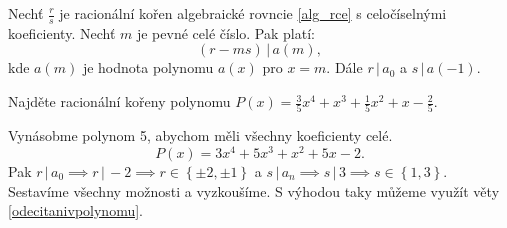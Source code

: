 \begin{veta}\label{odecitanivpolynomu}
    Nechť $\frac{r}{s}$ je racionální kořen algebraické rovncie \ref{alg_rce} s celočíselnými koeficienty.
    Nechť $m$ je pevné celé číslo. Pak platí:
    $$(r-ms) \, |\, a(m),$$
    kde $a(m)$ je hodnota polynomu $a(x)$ pro $x=m.$ Dále $r \, | \, a_0$ a $s\, |\, a(-1).$
\end{veta}

\begin{comment}
\begin{veta}[Hledání racionálních kořenů polynomu s racionálními koeficienty]
  Mějme polynom $P(x) \in \mathbb Q [x]$. Potom najdeme jeho kořeny $\frac{r}{s} \in \mathbb Q$ takto:
  \begin{enumerate}[1.]
    \item Nalezneme všechny celočíselné dělitele $r$ absolutního členu polynomu $a_0$.
    \item Nalezneme všechny přirozené dělitele $s$ vedoucího členu $a_n$.
    \item Utvoříme všechny zlomky tvaru $\frac{r}{s}, (r,s) = 1$.
    \item Hornerovým schématem určíme $P(1)$, případně $P(-1)$ ($1$ a $-1$ také mohou být kořeny).
    \item Vyškrtáme ty zlomky $\frac{r}{s}$, které nesplňují podmínky $(r-s) \mid P(1) \land (r+s) \mid P(-1)$.
    \item U ostatních zlomků vyzkoušíme Hornerovým schématem, zda jsou kořeny daného polynomu.
  \end{enumerate}
\end{veta}
\end{comment}

\begin{priklad}
Najděte racionální kořeny polynomu $P(x)=\frac{3}{5}x^4+x^3+\frac{1}{5}x^2+x-\frac{2}{5}.$
\end{priklad}

\begin{reseni}
Vynásobme polynom 5, abychom měli všechny koeficienty celé.
$$P(x) = 3x^4+5x^3+x^2+5x-2.$$
Pak $r \, | \, a_0 \implies r\, | \, -2 \implies r \in \left \{ \pm 2, \pm 1 \right \} $
a $s \, | \, a_n\implies s \, | \, 3 \implies s \in \left \{ 1, 3 \right \} $.
Sestavíme všechny možnosti a vyzkoušíme. S výhodou taky můžeme využít věty
\ref{odecitanivpolynomu}.
\end{reseni}


